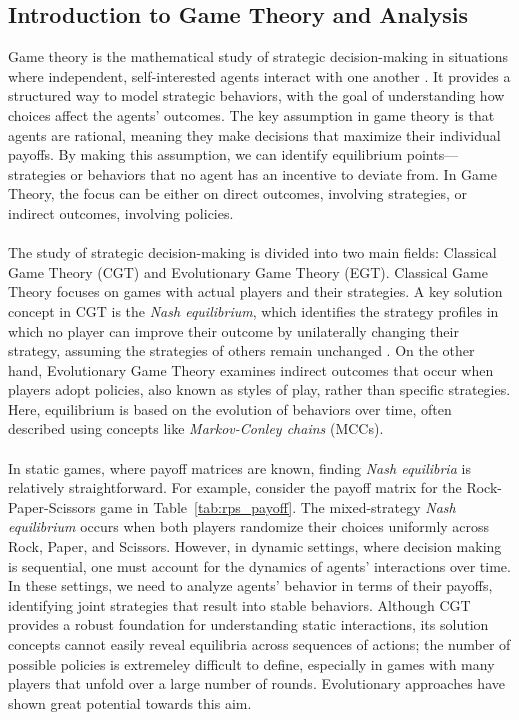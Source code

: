 \subsection{Introduction to Game Theory and Analysis}

\begin{flushleft}

    Game theory is the mathematical study of strategic decision-making in situations where independent, self-interested agents interact with one another \cite{Shoham_Leyton-Brown_2008}. It provides a structured way to model strategic behaviors, with the goal of understanding how choices affect the agents' outcomes. The key assumption in game theory is that agents are rational, meaning they make decisions that maximize their individual payoffs. By making this assumption, we can identify equilibrium points—strategies or behaviors that no agent has an incentive to deviate from. In Game Theory, the focus can be either on direct outcomes, involving strategies, or indirect outcomes, involving policies.\\~\\

    The study of strategic decision-making is divided into two main fields: Classical Game Theory (CGT) and Evolutionary Game Theory (EGT). Classical Game Theory focuses on games with actual players and their strategies. A key solution concept in CGT is the \emph{Nash equilibrium}, which identifies the strategy profiles in which no player can improve their outcome by unilaterally changing their strategy, assuming the strategies of others remain unchanged \cite{doi:10.1073/pnas.36.1.48}. On the other hand, Evolutionary Game Theory examines indirect outcomes that occur when players adopt policies, also known as styles of play, rather than specific strategies. Here, equilibrium is based on the evolution of behaviors over time, often described using concepts like \emph{Markov-Conley chains} (MCCs).\\~\\

    In static games, where payoff matrices are known, finding \emph{Nash equilibria} is relatively straightforward. For example, consider the payoff matrix for the Rock-Paper-Scissors game in Table~\ref{tab:rps_payoff}. The mixed-strategy \emph{Nash equilibrium} occurs when both players randomize their choices uniformly across Rock, Paper, and Scissors. However, in dynamic settings, where decision making is sequential, one must account for the dynamics of agents' interactions over time. In these settings, we need to analyze agents' behavior in terms of their payoffs, identifying joint strategies that result into stable behaviors. Although CGT provides a robust foundation for understanding static interactions, its solution concepts cannot easily reveal equilibria across sequences of actions; the number of possible policies is extremeley difficult to define, especially in games with many players that unfold over a large number of rounds. Evolutionary approaches have shown great potential towards this aim.\\~\\


\end{flushleft}
